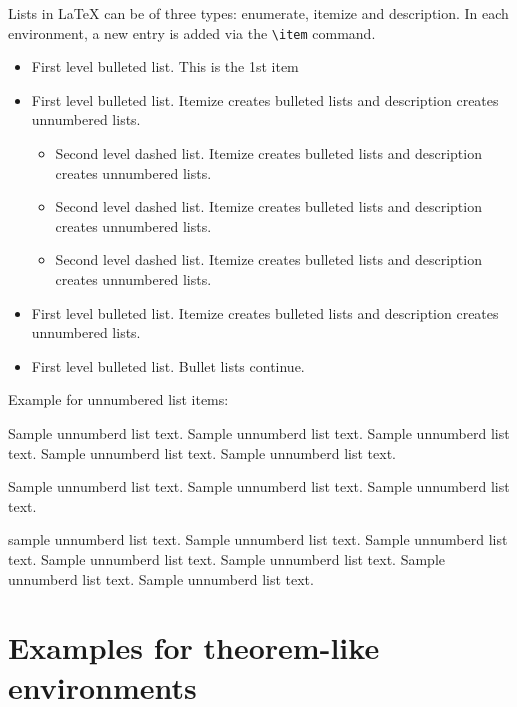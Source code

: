 \documentclass[namedate,webpdf,contemporary,large]{TBench-template}%
\theoremstyle{thmstyleone}%
\theoremstyle{thmstyletwo}%
\theoremstyle{thmstylethree}%
\begin{document}
Lists in \LaTeX{} can be of three types: enumerate, itemize and description.
In each environment, a new entry is added via the \verb+\item+ command.
\begin{itemize}
\item First level bulleted list. This is the 1st item

\item First level bulleted list. Itemize creates bulleted lists and description creates unnumbered lists.
\begin{itemize}
\item Second level dashed list. Itemize creates bulleted lists and description creates unnumbered lists.

\item Second level dashed list. Itemize creates bulleted lists and description creates unnumbered lists.

\item Second level dashed list. Itemize creates bulleted lists and description creates unnumbered lists.
\end{itemize}

\item First level bulleted list. Itemize creates bulleted lists and description creates unnumbered lists.

\item First level bulleted list. Bullet lists continue.
\end{itemize}

\noindent
Example for unnumbered list items:

\begin{unlist}
\item Sample unnumberd list text. Sample unnumberd list text. Sample unnumberd list text. Sample unnumberd list text. Sample unnumberd list text.

\item Sample unnumberd list text. Sample unnumberd list text. Sample unnumberd list text.

\item sample unnumberd list text. Sample unnumberd list text. Sample unnumberd list text. Sample unnumberd list text. Sample unnumberd list text. Sample unnumberd list text. Sample unnumberd list text.
\end{unlist}

\section{Examples for theorem-like environments}\label{sec10}
\end{document}
